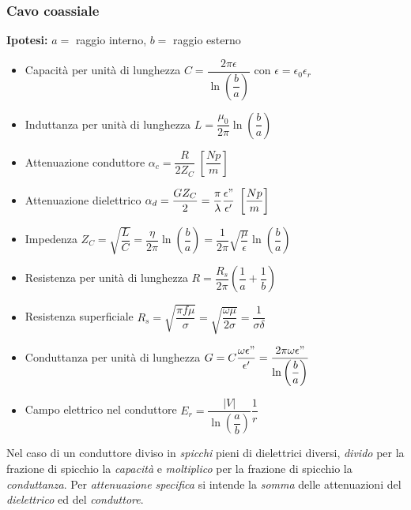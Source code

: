 \documentclass{article}
\begin{document}
\newpage

\subsubsection{Cavo coassiale}
\textbf{Ipotesi:} \(a = \) raggio interno, \(b = \) raggio esterno
\begin{itemize}
	\item Capacità per unità di lunghezza \( C = \dfrac{2 \pi \epsilon}{\ln\left(\dfrac{b}{a}\right)} \) con \( \epsilon = \epsilon_0 \epsilon_r \)
	\item Induttanza per unità di lunghezza \( L = \dfrac{\mu_0}{2 \pi} \ln\left(\dfrac{b}{a}\right) \)
	\item Attenuazione conduttore \( \alpha_c = \dfrac{R}{2 Z_C} \; \left[\dfrac{Np}{m}\right]\)
	\item Attenuazione dielettrico \( \alpha_d = \dfrac{G Z_C}{2} = \dfrac{\pi}{\lambda}\dfrac{\epsilon"}{\epsilon'} \; \left[\dfrac{Np}{m}\right]\)
	\item Impedenza \( Z_C = \sqrt{\dfrac{L}{C}} = \dfrac{\eta}{2 \pi} \ln\left(\dfrac{b}{a} \right) =  \dfrac{1}{2 \pi} \sqrt{\dfrac{\mu}{\epsilon}} \ln\left(\dfrac{b}{a}\right)\)
	\item Resistenza per unità di lunghezza \( R = \dfrac{R_s}{2 \pi} \left( \dfrac{1}{a} + \dfrac{1}{b} \right) \)
	\item Resistenza superficiale \( R_s = \sqrt{\dfrac{\pi f \mu}{\sigma}} = \sqrt{\dfrac{\omega \mu}{2 \sigma}} = \dfrac{1}{\sigma \delta} \)
	\item Conduttanza per unità di lunghezza \( G = C \dfrac{\omega\epsilon"}{\epsilon'} = \dfrac{2 \pi \omega \epsilon"}{\ln\left(\dfrac{b}{a} \right)} \)
	\item Campo elettrico nel conduttore \( E_r = \dfrac{|V|}{\ln \left( \dfrac{a}{b}\right)} \dfrac{1}{r} \)
\end{itemize}
Nel caso di un conduttore diviso in \textit{spicchi} pieni di dielettrici diversi, \textit{divido} per la frazione di spicchio la \textit{capacità} e \textit{moltiplico} per la frazione di spicchio la \textit{conduttanza}.
Per \textit{attenuazione specifica} si intende la \textit{somma} delle attenuazioni del \textit{dielettrico} ed del \textit{conduttore}.
\end{document}

